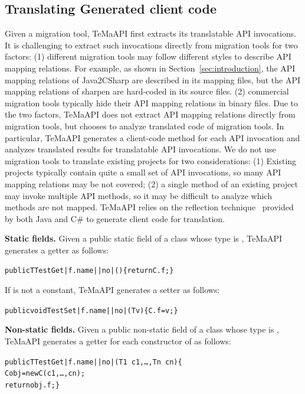 \subsection{Translating Generated client code}
\label{sec:approach:generating}
Given a migration tool, TeMaAPI first extracts its translatable API invocations. It is challenging to extract such invocations directly from migration tools for two factors: (1) different migration tools may follow different styles to describe API mapping relations. For example, as shown in Section~\ref{sec:introduction}, the API mapping relations of Java2CSharp are described in its mapping files, but the API mapping relations of sharpen are hard-coded in its source files. (2) commercial migration tools typically hide their API mapping relations in binary files. Due to the two factors, TeMaAPI does not extract API mapping relations directly from migration tools, but chooses to analyze translated code of migration tools. In particular, TeMaAPI generates a client-code method for each API invocation and analyzes translated results for translatable API invocations. We do not use migration tools to translate existing projects for two considerations: (1) Existing projects typically contain quite a small set of API invocations, so many API mapping relations may be not covered; (2) a single method of an existing project may invoke multiple API methods, so it may be difficult to analyze which methods are not mapped. TeMaAPI relies on the reflection technique~\cite{maes1987concepts} provided by both Java and C\# to generate client code for translation.

\textbf{Static fields.} Given a public static field  of a class  whose type is , TeMaAPI generates a getter as follows:
\begin{CodeOut}%
\begin{alltt}
 public T TestGet|f.name||no|()\{ return C.f; \}
\end{alltt}
\end{CodeOut}

If  is not a constant, TeMaAPI generates a setter as follows:
\begin{CodeOut}%
\begin{alltt}
 public void TestSet|f.name||no|(T v)\{ C.f = v; \}
\end{alltt}
\end{CodeOut}

\textbf{Non-static fields.} Given a public non-static field  of a class  whose type is , TeMaAPI generates a getter for each constructor  of  as follows:
\begin{CodeOut}%
\begin{alltt}
 public T TestGet|f.name||no|(T1\ c1,\ldots, Tn\ cn)\{
    C obj = new C(c1,\ldots, cn);
    return obj.f; \}
\end{alltt}
\end{CodeOut}

